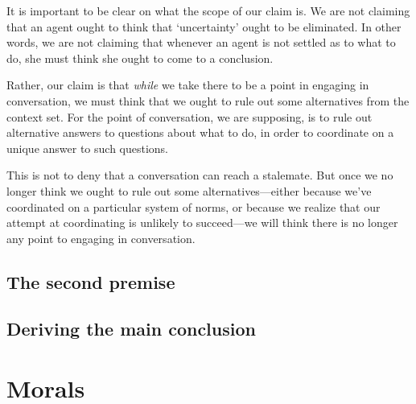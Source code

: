 \documentclass[11pt,article,oneside]{memoir}
\begin{document}
It is important to be clear on what the scope of our claim is. We are not claiming that an agent ought to think that `uncertainty' ought to be eliminated. In other words, we are not claiming that whenever an agent is not settled as to what to do, she must think she ought to come to a conclusion. 

Rather, our claim is that \emph{while} we take there to be a point in engaging in conversation, we must think that we ought to rule out some alternatives from the context set. For the point of conversation, we are supposing, is to rule out alternative answers to questions about what to do, in order to coordinate on a unique answer to such questions. 

This is not to deny that a conversation can reach a stalemate. But once we no longer think we ought to rule out some alternatives---either because we've coordinated on a particular system of norms, or because we realize that our attempt at coordinating is unlikely to succeed---we will think there is no longer any point to engaging in conversation. 





\subsection{The second premise}

\subsection{Deriving the main conclusion}



\section{Morals}\label{dragon}

 

\printbibliography
\end{document}
